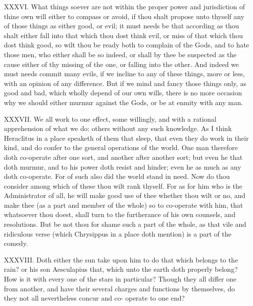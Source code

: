 XXXVI. What things soever are not within the proper power and
jurisdiction of thine own will either to compass or avoid, if thou shalt
propose unto thyself any of those things as either good, or evil; it must
needs be that according as thou shalt either fall into that which thou
dost think evil, or miss of that which thou dost think good, so wilt thou
be ready both to complain of the Gods, and to hate those men, who either
shall be so indeed, or shall by thee be suspected as the cause either of
thy missing of the one, or falling into the other. And indeed we must
needs commit many evils, if we incline to any of these things, more or
less, with an opinion of any difference. But if we mind and fancy those
things only, as good and bad, which wholly depend of our own wills, there
is no more occasion why we should either murmur against the Gods, or be at
enmity with any man.

XXXVII. We all work to one effect, some willingly, and with a rational
apprehension of what we do: others without any such knowledge. As I think
Heraclitus in a place speaketh of them that sleep, that even they do work
in their kind, and do confer to the general operations of the world. One
man therefore doth co-operate after one sort, and another after another
sort; but even he that doth murmur, and to his power doth resist and
hinder; even he as much as any doth co-operate. For of such also did the
world stand in need. Now do thou consider among which of these thou wilt
rank thyself. For as for him who is the Administrator of all, he will make
good use of thee whether thou wilt or no, and make thee (as a part and
member of the whole) so to co-operate with him, that whatsoever thou
doest, shall turn to the furtherance of his own counsels, and resolutions.
But be not thou for shame such a part of the whole, as that vile and
ridiculous verse (which Chrysippus in a place doth mention) is a part of
the comedy.

XXXVIII. Doth either the sun take upon him to do that which belongs to
the rain? or his son Aesculapius that, which unto the earth doth properly
belong? How is it with every one of the stars in particular? Though they
all differ one from another, and have their several charges and functions
by themselves, do they not all nevertheless concur and co- operate to one
end?

